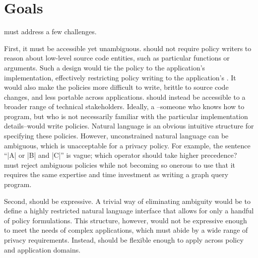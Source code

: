 \section{Goals}
\syslang{} must address a few challenges.

First, it must be accessible yet unambiguous.
%
\syslang{} should not require policy writers to reason about low-level source code entities, such as particular functions or arguments.
%
Such a design would tie the policy to the application's implementation, effectively restricting policy writing to the application's \devs.
%
It would also make the policies more difficult to write, brittle to source code changes, and less portable across applications.
%
\syslang{} should instead be accessible to a broader range of technical stakeholders.
%
Ideally, a \ce--someone who knows how to program, 
but who is not necessarily familiar with the particular implementation details--would write policies.
%
% 
Natural language is an obvious intuitive structure for specifying these policies.
%
However, unconstrained natural language can be ambiguous, which is unacceptable for a privacy policy.
%
For example, the sentence ``|A| or |B| and |C|'' is vague; which operator should take higher precedence?
%
\syslang{} must reject ambiguous policies while not becoming so onerous to use that it 
requires the same expertise and time investment as writing a graph query program.

Second, \syslang{} should be expressive.
%
A trivial way of eliminating ambiguity would be to define a highly restricted natural language interface that allows for only a handful of policy formulations.
%
This structure, however, would not be expressive enough to meet the needs of complex applications, 
which must abide by a wide range of privacy requirements.
%
Instead, \syslang{} should be flexible enough to apply across policy and application domains.

